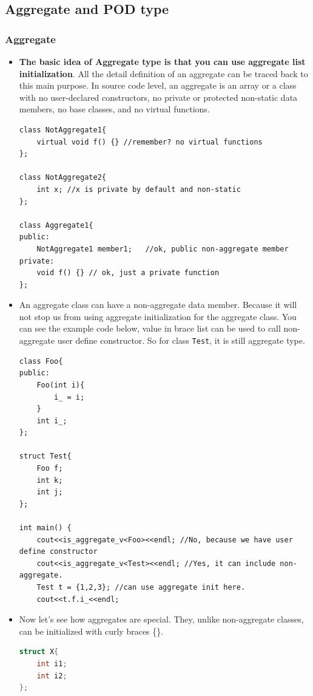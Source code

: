 \documentclass[a4paper,11pt,twoside]{book}
\begin{document}
\subsection{Aggregate and POD type}
\subsubsection{Aggregate}
\begin{itemize}
	\item \textbf{The basic idea of Aggregate type is that you can use aggregate list initialization}. All the detail definition of an aggregate can be traced back to this main purpose. In source code level, an aggregate is an array or a class with no user-declared constructors, no private or protected non-static data members, no base classes, and no virtual functions.
\begin{lstlisting}[numbers=none]
class NotAggregate1{
	virtual void f() {} //remember? no virtual functions
};
	
class NotAggregate2{
	int x; //x is private by default and non-static 
};
	
class Aggregate1{
public:
	NotAggregate1 member1;   //ok, public non-aggregate member
private:
	void f() {} // ok, just a private function
};
\end{lstlisting}

	\item  An aggregate class can have a non-aggregate data member. Because it will not stop us from using aggregate initialization for the aggregate class. You can see the example code below, value in brace list can be used to call non-aggregate user define constructor. So for class \texttt{Test}, it is still aggregate type.
\begin{lstlisting}[]
class Foo{
public:
    Foo(int i){
        i_ = i;
    }
    int i_;
};

struct Test{
    Foo f;
    int k;
    int j;
};

int main() {
    cout<<is_aggregate_v<Foo><<endl; //No, because we have user define constructor
    cout<<is_aggregate_v<Test><<endl; //Yes, it can include non-aggregate.
    Test t = {1,2,3}; //can use aggregate init here.
    cout<<t.f.i_<<endl;
\end{lstlisting}

	\item Now let's see how aggregates are special. They, unlike non-aggregate classes, can be initialized with curly braces \{\}. 
\begin{lstlisting}[frame=single, language=c++]
struct X{
	int i1;
	int i2;
};
	

\end{lstlisting}
\end{itemize}
\end{document}
